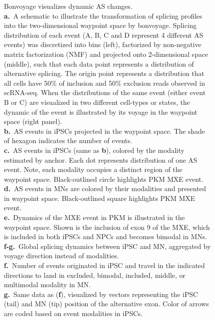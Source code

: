\clearpage
\thispagestyle{facingcaption}
\begin{figure}[h]
\captionsetup{labelformat=prev-page}
\caption[Bonvoyage visualizes dynamic AS changes.]{Bonvoyage visualizes dynamic AS changes.\\
\textbf{a.}~A schematic to illustrate the transformation of splicing profiles into the two-dimensional waypoint space by bonvoyage. Splicing distribution of each event (A, B, C and D represent 4 different AS events) was discretized into bins (left), factorized by non-negative matrix factorization (NMF) and projected onto 2-dimensional space (middle), such that each data point represents a distribution of alternative splicing. The origin point represents a distribution that all cells have 50\% of inclusion and 50\% exclusion reads observed in scRNA-seq. When the distributions of the same event (either event B or C) are visualized in two different cell-types or states, the dynamic of the event is illustrated by its voyage in the waypoint space (right panel).\\
\textbf{b.}~AS events in iPSCs projected in the waypoint space. The shade of hexagon indicates the number of events. \\
\textbf{c.}~AS events in iPSCs (same as \textbf{b}), colored by the modality estimated by anchor. Each dot represents distribution of one AS event. Note, each modality occupies a distinct region of the waypoint space. Black-outlined circle highlights PKM MXE event.\\
\textbf{d.}~AS events in MNs are colored by their modalities and presented in waypoint space. Black-outlined square highlights PKM MXE event.\\
\textbf{e.}~Dynamics of the MXE event in PKM is illustrated in the waypoint space. Shown is the inclusion of exon 9 of the MXE, which is included in both iPSCs and NPCs and becomes bimodal in MNs.\\
\textbf{f-g.}~Global splicing dynamics between iPSC and MN, aggregated by voyage direction instead of modalities. \\
\textbf{f.}~Number of events originated in iPSC and travel in the indicated directions to land in excluded, bimodal, included, middle, or multimodal modality in MN. \\
\textbf{g.}~Same data as (\textbf{f}), visualized by vectors representing the iPSC (tail) and MN (tip) position of the alternative exon. Color of arrows are coded based on event modalities in iPSCs.
}
\label{fig:bonvoyage_overview}
\end{figure}
